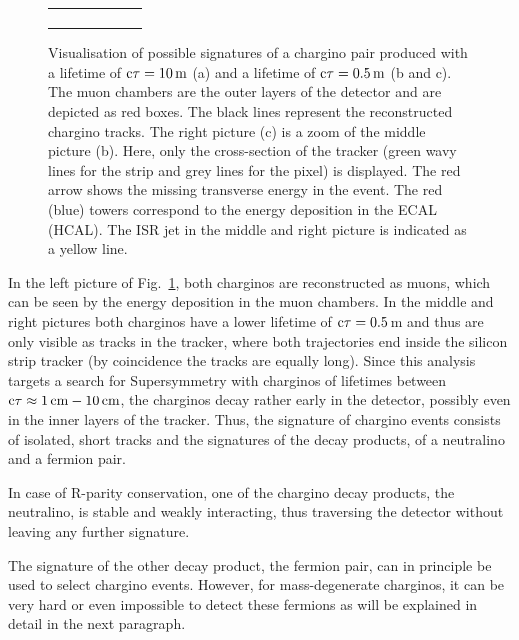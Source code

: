 \begin{figure}[!t]
\begin{tabular}{c}
\begin{subfigure}{0.31\textwidth}
      \caption{}
  \end{subfigure} 
  \end{tabular}
  \caption{Visualisation of possible signatures of a chargino pair produced with a lifetime of $\text{c}\tau = 10\,\text{m}$ (a) and a lifetime of $\text{c}\tau = 0.5\,\text{m}$ (b and c). 
           The muon chambers are the outer layers of the detector and are depicted as red boxes.
           The black lines represent the reconstructed chargino tracks.
           The right picture (c) is a zoom of the middle picture (b). 
           Here, only the cross-section of the tracker (green wavy lines for the strip and grey lines for the pixel) is displayed. The red arrow shows the missing transverse energy in the event.
           The red (blue) towers correspond to the energy deposition in the ECAL (HCAL).
           The ISR jet in the middle and right picture is indicated as a yellow line.} 
  \label{fig:CharginoPaiEventDisplay}
\end{figure}
In the left picture of Fig.~\ref{fig:CharginoPaiEventDisplay}, both charginos are reconstructed as muons, which can be seen by the energy deposition in the muon chambers.
In the middle and right pictures both charginos have a lower lifetime of $\text{c}\tau=0.5\,$m and thus are only visible as tracks in the tracker, where both trajectories end inside the silicon strip tracker (by coincidence the tracks are equally long).
Since this analysis targets a search for Supersymmetry with charginos of lifetimes between $\text{c}\tau \approx 1\,\text{cm} - 10\,\text{cm}$, the charginos decay rather early in the detector, possibly even in the inner layers of the tracker.
Thus, the signature of chargino events consists of isolated, short tracks and the signatures of the decay products, \ie of a neutralino and a fermion pair. 

In case of R-parity conservation, one of the chargino decay products, the neutralino, is stable and weakly interacting, thus traversing the detector without leaving any further signature.

The signature of the other decay product, the fermion pair, can in principle be used to select chargino events. 
However, for mass-degenerate charginos, it can be very hard or even impossible to detect these fermions as will be explained in detail in the next paragraph.

